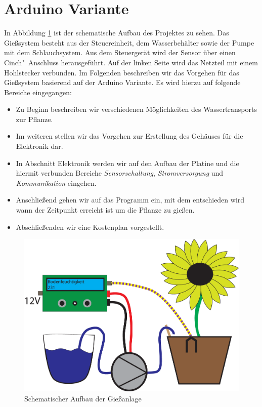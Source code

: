 \section{Arduino Variante}

In Abbildung \ref{fig-SchemaAufbau} ist der schematische Aufbau des Projektes zu sehen. Das Gießsystem besteht aus der Steuereinheit, dem Wasserbehälter sowie der Pumpe mit dem Schlauchsystem. Aus dem Steuergerät wird der Sensor über einen Cinch"~Anschluss herausgeführt. Auf der linken Seite wird das Netzteil mit einem Hohlstecker verbunden. 
Im Folgenden beschreiben wir das Vorgehen für das Gießsystem basierend auf der Arduino Variante. 
Es wird hierzu auf folgende Bereiche eingegangen:

\begin{itemize}
	\item Zu Beginn beschreiben wir verschiedenen Möglichkeiten des Wassertransports zur Pflanze.
	\item Im weiteren stellen wir das Vorgehen zur Erstellung des Gehäuses für die Elektronik dar.
	\item In Abschnitt Elektronik werden wir auf den Aufbau der Platine und die hiermit verbunden Bereiche \emph{Sensorschaltung}, \emph{Stromversorgung} und \emph{Kommunikation} eingehen.
	\item Anschließend gehen wir auf das Programm ein, mit dem entschieden wird wann der Zeitpunkt erreicht ist um die Pflanze zu gießen.
	\item Abschließenden wir eine Kostenplan vorgestellt. 
	
\end{itemize}

	\begin{figure}[ht]
	\centering
	\includegraphics[width=0.9\linewidth]{bilder/Bild_Aufbau.eps}	
	\caption{Schematischer Aufbau der Gießanlage}
	\label{fig-SchemaAufbau}
	\end{figure}

